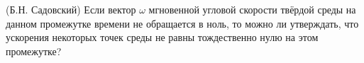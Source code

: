 (Б.Н. Садовский)
Если вектор $\omega$ мгновенной угловой скорости твёрдой среды на данном 
промежутке времени не обращается в ноль, то можно ли утверждать, что 
ускорения некоторых точек среды не равны тождественно нулю на этом 
промежутке?

